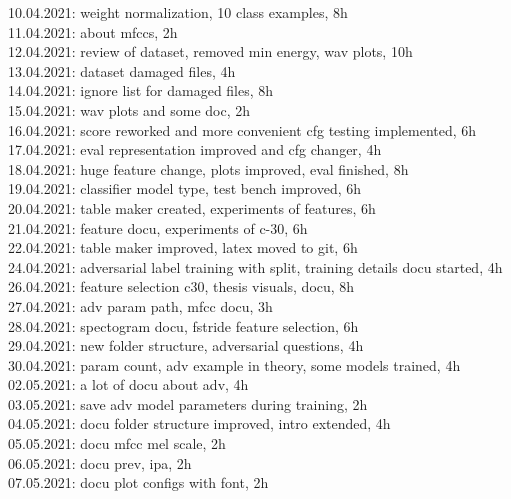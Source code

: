 10.04.2021: weight normalization, 10 class examples, 8h\\
11.04.2021: about mfccs, 2h\\

12.04.2021: review of dataset, removed min energy, wav plots, 10h\\

13.04.2021: dataset damaged files, 4h\\
14.04.2021: ignore list for damaged files, 8h\\

15.04.2021: wav plots and some doc, 2h\\
16.04.2021: score reworked and more convenient cfg testing implemented, 6h\\


17.04.2021: eval representation improved and cfg changer, 4h\\
18.04.2021: huge feature change, plots improved, eval finished, 8h\\

19.04.2021: classifier model type, test bench improved, 6h\\
20.04.2021: table maker created, experiments of features, 6h\\

21.04.2021: feature docu, experiments of c-30, 6h\\

22.04.2021: table maker improved, latex moved to git, 6h\\
24.04.2021: adversarial label training with split, training details docu started, 4h\\

26.04.2021: feature selection c30, thesis visuals, docu, 8h\\
27.04.2021: adv param path, mfcc docu, 3h\\

28.04.2021: spectogram docu, fstride feature selection, 6h\\
29.04.2021: new folder structure, adversarial questions, 4h\\

30.04.2021: param count, adv example in theory, some models trained, 4h\\
02.05.2021: a lot of docu about adv, 4h\\
03.05.2021: save adv model parameters during training, 2h\\

04.05.2021: docu folder structure improved, intro extended, 4h\\
05.05.2021: docu mfcc mel scale, 2h\\
06.05.2021: docu prev, ipa, 2h\\
07.05.2021: docu plot configs with font, 2h\\

